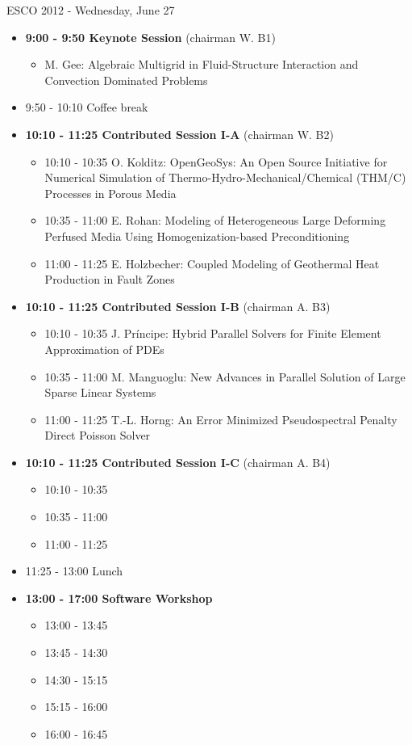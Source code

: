 \documentclass[10pt, A4]{article}%
\begin{document}
\newpage

\centerline{\huge ESCO 2012 - Wednesday, June 27}
\vspace{4mm}

\begin{itemize}    
  \item {\bf 9:00 - 9:50 Keynote Session} (chairman W. B1) 
  \begin{itemize}
    \item M. Gee: Algebraic Multigrid in Fluid-Structure Interaction and Convection Dominated Problems
  \end{itemize}
  \item 9:50 - 10:10 Coffee break
  \item {\bf 10:10 - 11:25 Contributed Session I-A} (chairman W. B2) 
  \begin{itemize}
    \item 10:10 - 10:35 O. Kolditz: OpenGeoSys: An Open Source Initiative for Numerical Simulation of Thermo-Hydro-Mechanical/Chemical (THM/C) Processes in Porous
Media
    \item 10:35 - 11:00 E. Rohan: Modeling of Heterogeneous Large Deforming Perfused Media Using Homogenization-based Preconditioning
    \item 11:00 - 11:25 E. Holzbecher: Coupled Modeling of Geothermal Heat Production in Fault Zones
  \end{itemize}
  \item {\bf 10:10 - 11:25 Contributed Session I-B} (chairman A. B3) 
  \begin{itemize}
    \item 10:10 - 10:35 J. Pr\'{i}ncipe: Hybrid Parallel Solvers for Finite Element Approximation of PDEs
    \item 10:35 - 11:00 M. Manguoglu: New Advances in Parallel Solution of Large Sparse Linear Systems
    \item 11:00 - 11:25 T.-L. Horng: An Error Minimized Pseudospectral Penalty Direct Poisson Solver
  \end{itemize}
  \item {\bf 10:10 - 11:25 Contributed Session I-C} (chairman A. B4) 
  \begin{itemize}
    \item 10:10 - 10:35 
    \item 10:35 - 11:00 
    \item 11:00 - 11:25 
  \end{itemize}
  \item 11:25 - 13:00 Lunch
  \item {\bf 13:00 - 17:00 Software Workshop}
  \begin{itemize}
    \item 13:00 - 13:45 
    \item 13:45 - 14:30 
    \item 14:30 - 15:15 
    \item 15:15 - 16:00 
    \item 16:00 - 16:45 
  \end{itemize}
\end{itemize}
\end{document}
